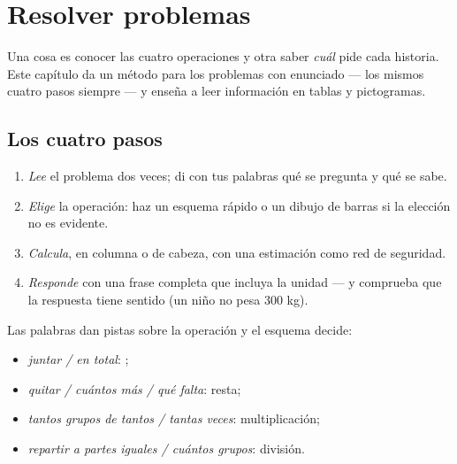 \chapter{Resolver problemas}\label{ch:g3:problems}

Una cosa es conocer las cuatro operaciones y otra saber \emph{cuál} pide
cada historia. Este capítulo da un método para los problemas con
enunciado --- los mismos cuatro pasos siempre --- y enseña a
leer información en tablas y pictogramas.

\section{Los cuatro pasos}

\begin{method}\label{met:g3:problems:steps}
\begin{enumerate}
  \item \emph{Lee} el problema dos veces; di con tus palabras qué se
        pregunta y qué se sabe.
  \item \emph{Elige} la operación: haz un esquema rápido o un dibujo de
        barras si la elección no es evidente.
  \item \emph{Calcula}, en columna o de cabeza, con una estimación como
        red de seguridad.
  \item \emph{Responde} con una frase completa que incluya la unidad ---
        y comprueba que la respuesta tiene sentido (un niño no pesa
        $300$ kg).
\end{enumerate}
\end{method}

\begin{example}\label{ex:g3:problems:which}
Las palabras dan pistas sobre la operación y el esquema decide:
\begin{itemize}
  \item \emph{juntar / en total}: ;
  \item \emph{quitar / cuántos más / qué falta}:
        resta;
  \item \emph{tantos grupos de tantos / tantas veces}:
        multiplicación;
  \item \emph{repartir a partes iguales / cuántos grupos}: división.
\end{itemize}
\end{example}

